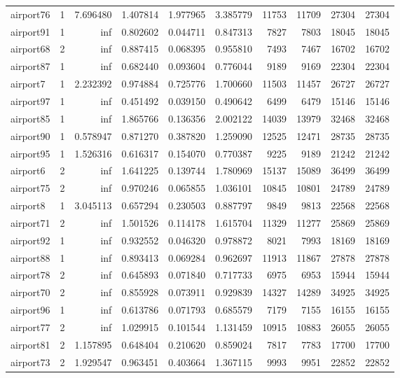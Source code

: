 \begin{longtable}{|l|r|r|r|r|r|r|r|r|r|}
airport76 & 1 & 7.696480 & 1.407814 & 1.977965 & 3.385779 & 11753 & 11709 & 27304 & 27304 \\
airport91 & 1 & inf & 0.802602 & 0.044711 & 0.847313 & 7827 & 7803 & 18045 & 18045 \\
airport68 & 2 & inf & 0.887415 & 0.068395 & 0.955810 & 7493 & 7467 & 16702 & 16702 \\
airport87 & 1 & inf & 0.682440 & 0.093604 & 0.776044 & 9189 & 9169 & 22304 & 22304 \\
airport7 & 1 & 2.232392 & 0.974884 & 0.725776 & 1.700660 & 11503 & 11457 & 26727 & 26727 \\
airport97 & 1 & inf & 0.451492 & 0.039150 & 0.490642 & 6499 & 6479 & 15146 & 15146 \\
airport85 & 1 & inf & 1.865766 & 0.136356 & 2.002122 & 14039 & 13979 & 32468 & 32468 \\
airport90 & 1 & 0.578947 & 0.871270 & 0.387820 & 1.259090 & 12525 & 12471 & 28735 & 28735 \\
airport95 & 1 & 1.526316 & 0.616317 & 0.154070 & 0.770387 & 9225 & 9189 & 21242 & 21242 \\
airport6 & 2 & inf & 1.641225 & 0.139744 & 1.780969 & 15137 & 15089 & 36499 & 36499 \\
airport75 & 2 & inf & 0.970246 & 0.065855 & 1.036101 & 10845 & 10801 & 24789 & 24789 \\
airport8 & 1 & 3.045113 & 0.657294 & 0.230503 & 0.887797 & 9849 & 9813 & 22568 & 22568 \\
airport71 & 2 & inf & 1.501526 & 0.114178 & 1.615704 & 11329 & 11277 & 25869 & 25869 \\
airport92 & 1 & inf & 0.932552 & 0.046320 & 0.978872 & 8021 & 7993 & 18169 & 18169 \\
airport88 & 1 & inf & 0.893413 & 0.069284 & 0.962697 & 11913 & 11867 & 27878 & 27878 \\
airport78 & 2 & inf & 0.645893 & 0.071840 & 0.717733 & 6975 & 6953 & 15944 & 15944 \\
airport70 & 2 & inf & 0.855928 & 0.073911 & 0.929839 & 14327 & 14289 & 34925 & 34925 \\
airport96 & 1 & inf & 0.613786 & 0.071793 & 0.685579 & 7179 & 7155 & 16155 & 16155 \\
airport77 & 2 & inf & 1.029915 & 0.101544 & 1.131459 & 10915 & 10883 & 26055 & 26055 \\
airport81 & 2 & 1.157895 & 0.648404 & 0.210620 & 0.859024 & 7817 & 7783 & 17700 & 17700 \\
airport73 & 2 & 1.929547 & 0.963451 & 0.403664 & 1.367115 & 9993 & 9951 & 22852 & 22852 \\

\end{longtable}
